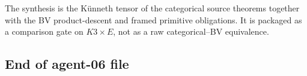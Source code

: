 The synthesis is the K\"unneth tensor of the categorical source
theorems together with the BV product-descent and framed primitive
obligations. It is packaged as a comparison gate on $K3 \times E$, not
as a raw categorical--BV equivalence.

\subsection*{End of agent-06 file}

